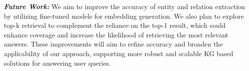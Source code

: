  
\textit{\textbf{Future Work:}} We aim to improve the accuracy of entity and relation extraction by utilizing fine-tuned models for embedding generation. We also plan to explore top-k retrieval to complement the reliance on the top-1 result, which could enhance coverage and increase the likelihood of retrieving the most relevant answers. These improvements will aim to refine accuracy and broaden the applicability of our approach, supporting more robust and scalable KG based solutions for answering user queries.